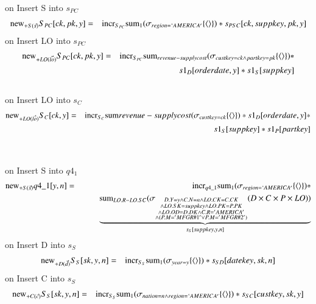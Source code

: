 on Insert S into $s_{PC}$
\begin{eqnarray}
\mathrm{new}_{+S(\vec{s})} S_{PC} [ck, pk, y] &=& \mathrm{incr}_{S_{PC}}
\mathrm{sum}_{1} (\sigma_{region = `AMERICA'} \{{\langle\rangle}\}) * s_{PSC} [ck, suppkey, pk, y]
\end{eqnarray}
on Insert LO into $s_{PC}$
\begin{eqnarray}
\mathrm{new}_{+LO(\vec{lo})} S_{PC} [ck, pk, y] &=& \mathrm{incr}_{S_{PC}}
\mathrm{sum}_{revenue-supplycost} (\sigma_{custkey = ck \wedge partkey = pk} \{{\langle\rangle}\}) * 
\\\nonumber&&\qquad s1_{D}[orderdate, y] * s1_{S}[suppkey]
\end{eqnarray}
\\
on Insert LO into $s_C$
\begin{eqnarray}
\mathrm{new}_{+LO(\vec{lo})} S_{C} [ck, y] &=& \mathrm{incr}_{S_{C}}
\mathrm{sum}{revenue-supplycost} (\sigma_{custkey = ck} \{{\langle\rangle}\}) * s1_{D} [orderdate, y] * \\\nonumber&&\qquad s1_{S} [suppkey] * s1_{P} [partkey]
\end{eqnarray}
\\\\
on Insert S into $q4_1$\\
\begin{eqnarray}
\mathrm{new}_{+S(\vec{s})} q4\_1[y,n] &=& 
\mathrm{incr}_{q4\_1} \mathrm{sum}_{1} (\sigma_{region = `AMERICA'} \{{\langle\rangle}\}) *\\
\nonumber&&\qquad \underbrace{\mathrm{sum}_{LO.R - LO.SC} (\sigma_{\substack{ D.Y = y \wedge C.N = n \wedge LO.CK = C.CK \\\wedge LO.SK = suppkey \wedge LO.PK = P.PK \\\wedge LO.OD = D.DK \wedge C.R = 'AMERICA' \\\wedge ( P.M = 'MFGR\#1' \vee P.M = 'MFGR\#2')}} (D \times  C \times P \times LO))}_{s_{S}[suppkey, y, n]}
\end{eqnarray}
on Insert D into $s_S$
\begin{eqnarray}
\mathrm{new}_{+D(\vec{d})} S_{S} [sk, y, n] &=& \mathrm{incr}_{S_{S}}
\mathrm{sum}_{1} (\sigma_{year = y} \{{\langle\rangle}\}) * s_{SD} [datekey, sk, n]
\end{eqnarray}
on Insert C into $s_S$
\begin{eqnarray}
\mathrm{new}_{+C(\vec{c})} S_{S} [sk, y, n] &=& \mathrm{incr}_{S_{S}}
\mathrm{sum}_{1} (\sigma_{nation = n \wedge region  =`AMERICA'} \{{\langle\rangle}\}) * s_{SC}[custkey, sk, y]
\end{eqnarray}
